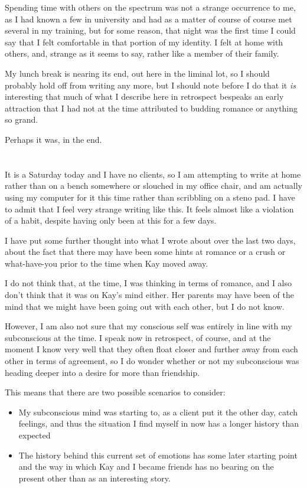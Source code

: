 Spending time with others on the spectrum was not a strange occurrence to me, as I had known a few in university and had as a matter of course of course met several in my training, but for some reason, that night was the first time I could say that I felt comfortable in that portion of my identity. I felt at home with others, and, strange as it seems to say, rather like a member of their family.

My lunch break is nearing its end, out here in the liminal lot, so I should probably hold off from writing any more, but I should note before I do that it \emph{is} interesting that much of what I describe here in retrospect bespeaks an early attraction that I had not at the time attributed to budding romance or anything so grand.

Perhaps it was, in the end.

\section{}

It is a Saturday today and I have no clients, so I am attempting to write at home rather than on a bench somewhere or slouched in my office chair, and am actually using my computer for it this time rather than scribbling on a steno pad. I have to admit that I feel very strange writing like this. It feels almost like a violation of a habit, despite having only been at this for a few days.

I have put some further thought into what I wrote about over the last two days, about the fact that there may have been some hints at romance or a crush or what-have-you prior to the time when Kay moved away.

I do not think that, at the time, I was thinking in terms of romance, and I also don't think that it was on Kay's mind either. Her parents may have been of the mind that we might have been going out with each other, but I do not know.

However, I am also not sure that my conscious self was entirely in line with my subconscious at the time. I speak now in retrospect, of course, and at the moment I know very well that they often float closer and further away from each other in terms of agreement, so I do wonder whether or not my subconscious was heading deeper into a desire for more than friendship.

This means that there are two possible scenarios to consider:

\begin{itemize}
\tightlist
\item
  My subconscious mind was starting to, as a client put it the other day, catch feelings, and thus the situation I find myself in now has a longer history than expected
\item
  The history behind this current set of emotions has some later starting point and the way in which Kay and I became friends has no bearing on the present other than as an interesting story.
\end{itemize}

